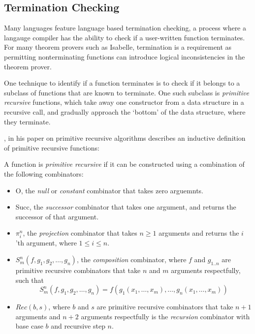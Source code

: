 \subsection{Termination Checking}

Many languages feature language based termination checking, a process
where a langauge compiler has the ability to check if a user-written function
terminates. For many theorem provers such as Isabelle, 
termination is a requirement as permitting nonterminating functions
can introduce logical inconsistencies in the theorem prover.

One technique to identify if a function terminates is to check if it belongs
to a subclass of functions that are known to terminate. One such subclass
is \textit{primitive recursive} functions, which take away one constructor
from a data structure in a recursive call, and gradually approach the
`bottom' of the data structure, where they terminate.

\citet{AboutPrimrecAlgorithms}, in his paper on primitive recursive algorithms 
describes an inductive definition of primitive recursive functions:

\theoremstyle{definition}
\begin{definition}
    \label{def:primrec}
    A function is \textit{primitive recursive} if it can be constructed using 
    a combination of the following combinators:

    \begin{itemize}
        \item 
            \textsf{O}, the \textit{null} or \textit{constant} combinator that takes zero arguemnts.
        \item 
            \textsf{Succ}, the \textit{successor} combinator that takes one argument, and returns the successor
            of that argument.
        \item 
            \textsf{$\pi^n_i$}, the \textit{projection} combinator that takes $n \geq 1$ arguments and returns
            the $i$'th argument, where $1 \leq i \leq n$.
        \item 
            \textsf{$S^n_m(f, g_1, g_2, \dots, g_n)$}, the \textit{composition} combinator, where $f$ and $g_{1..n}$ are 
            primitive recursive combinators that take $n$ and $m$ arguments respectfully, such that 
                $$S^n_m(f, g_1, g_2, \dots, g_n) = f(g_1(x_1, \dots, x_m), \dots, g_n(x_1, \dots, x_m))$$
        \item 
            \textsf{$Rec(b,s)$}, where $b$ and $s$ are primitive recursive combinators that take
            $n + 1$ arguments and $n + 2$ arguments respectfully is the \textit{recursion}
            combinator with base case $b$ and recursive step $n$.
    \end{itemize}
\end{definition}

